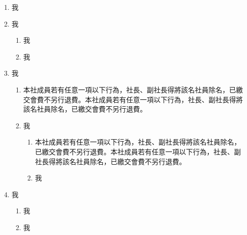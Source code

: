 \documentclass[10pt, a4paper]{cos}
\begin{document}
\begin{enumerate}
\item 我
\item 我
\begin{enumerate}
\item 我
\item 我
\end{enumerate}
\item 我
\begin{enumerate}
\item 本社成員若有任意一項以下行為，社長、副社長得將該名社員除名，已繳交會費不另行退費。本社成員若有任意一項以下行為，社長、副社長得將該名社員除名，已繳交會費不另行退費。
\item 我
\begin{enumerate}
\item 本社成員若有任意一項以下行為，社長、副社長得將該名社員除名，已繳交會費不另行退費。本社成員若有任意一項以下行為，社長、副社長得將該名社員除名，已繳交會費不另行退費。
\item 我
\end{enumerate}
\end{enumerate}
\item 我
\begin{enumerate}
\item 我
\item 我
\end{enumerate}
\end{enumerate}
\end{document}
